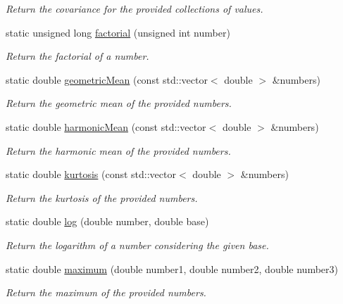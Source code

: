 \begin{DoxyCompactItemize}
\begin{DoxyCompactList}\small\item\em Return the covariance for the provided collections of values. \end{DoxyCompactList}\item 
static unsigned long \hyperlink{classmultiscale_1_1Numeric_a8728bd6bdba7cb92d15c8c82b3073e5a}{factorial} (unsigned int number)
\begin{DoxyCompactList}\small\item\em Return the factorial of a number. \end{DoxyCompactList}\item 
static double \hyperlink{classmultiscale_1_1Numeric_a53023741b672ebb4790bc2e89dbe1ee9}{geometric\-Mean} (const std\-::vector$<$ double $>$ \&numbers)
\begin{DoxyCompactList}\small\item\em Return the geometric mean of the provided numbers. \end{DoxyCompactList}\item 
static double \hyperlink{classmultiscale_1_1Numeric_a7ed4c2e74893a486e639051abfbbcdb7}{harmonic\-Mean} (const std\-::vector$<$ double $>$ \&numbers)
\begin{DoxyCompactList}\small\item\em Return the harmonic mean of the provided numbers. \end{DoxyCompactList}\item 
static double \hyperlink{classmultiscale_1_1Numeric_a71ef1e4e0e845b64bcb06a27b9f8fbd3}{kurtosis} (const std\-::vector$<$ double $>$ \&numbers)
\begin{DoxyCompactList}\small\item\em Return the kurtosis of the provided numbers. \end{DoxyCompactList}\item 
static double \hyperlink{classmultiscale_1_1Numeric_a27b50deac29d8aca5c41c8b19fba43e9}{log} (double number, double base)
\begin{DoxyCompactList}\small\item\em Return the logarithm of a number considering the given base. \end{DoxyCompactList}\item 
static double \hyperlink{classmultiscale_1_1Numeric_a54d5578d5980315b7bade31a5655cd72}{maximum} (double number1, double number2, double number3)
\begin{DoxyCompactList}\small\item\em Return the maximum of the provided numbers. \end{DoxyCompactList}\item 

\end{DoxyCompactItemize}
